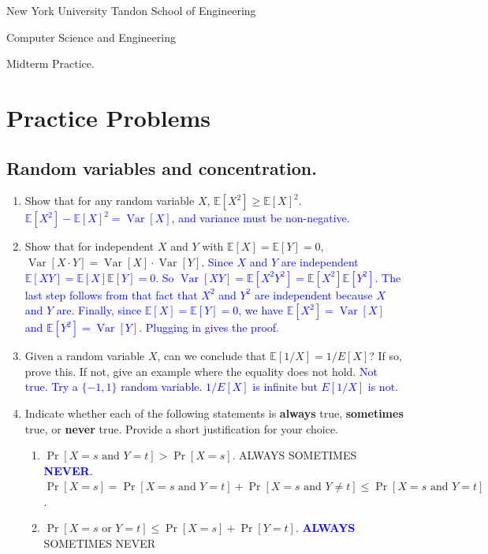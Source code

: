 \documentclass[10pt]{article}
\newcommand{\E}{\mathbb{E}}
\DeclareMathOperator*{\Var}{Var}
\begin{document}
	
\begin{center}
	\normalsize
	New York University Tandon School of Engineering
	
	Computer Science and Engineering
	\medskip
	
	\large
Midterm Practice. 
	\medskip
\end{center} 

\section{Practice Problems}

\subsection{Random variables and concentration.}

\begin{enumerate}
	\item Show that for any  random variable ${X}$, $\E[{X}^2] \ge \E[{X}]^2$.
	\textcolor{blue}{$\E[X^2] - \E[{X}]^2 = \Var[X]$, and variance must be non-negative.}
	\item Show that for independent ${X}$ and ${Y}$ with $\E[{X}] = \E[{Y}] = 0$, $\Var[{X} \cdot {Y}] = \Var[X] \cdot \Var[Y]$. 
	\textcolor{blue}{Since $X$ and $Y$ are independent $\E[XY] = \E[X]\E[Y] = 0$. So $\Var[XY] = \E[X^2Y^2] = \E[X^2]\E[Y^2]$. The last step follows from that fact that $X^2$ and $Y^2$ are independent because $X$ and $Y$ are. Finally, since $\E[X] = \E[Y] = 0$, we have $\E[X^2] = \Var[X]$ and $\E[Y^2] = \Var[Y]$. Plugging in gives the proof.}
	\item Given a random variable $X$, can we conclude that $\E[1/X] = 1/E[X]$? If so, prove this. If not, give an example where the equality does not hold.
	\textcolor{blue}{Not true. Try a $\{-1,1\}$ random variable. $1/E[X]$ is infinite but $E[1/X]$ is not.}
	\item Indicate whether each of the following statements is \textbf{always} true, \textbf{sometimes} true, or \textbf{never} true. Provide a short justification for your choice. 
	\begin{enumerate}[label=(\alph*)]
		\item $\Pr[{X} = s \text{ and } {Y} = t] > \Pr[{X} = s]$. \hspace{1em}ALWAYS\hspace{1em} SOMETIMES\hspace{1em} \textcolor{blue}{\textbf{NEVER}}. $\Pr[{X} = s] = \Pr[{X} = s \text{ and } {Y} = t] + \Pr[{X} = s \text{ and } {Y} \neq t] \leq \Pr[{X} = s \text{ and } {Y} = t]$. 
		\item $\Pr[{X} = s \text{ or }  {Y} = t] \le \Pr[{X} = s] + \Pr[{Y} = t]$. \hspace{1em}\textcolor{blue}{\textbf{ALWAYS}}\hspace{1em} SOMETIMES\hspace{1em} NEVER
		

\end{enumerate}
\end{enumerate}
\end{document}
